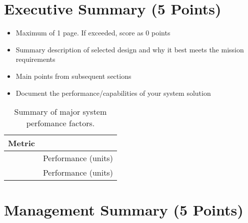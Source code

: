 \documentclass[report]{byu-aero}
\begin{document}


\setcounter{page}{2} %
\thispagestyle{tocpage} %
\tableofcontents %
{}

\clearpage
\newpage

\section{Executive Summary (5 Points)}
\label{sec:ExecutiveSummary}
\begin{itemize}
\item Maximum of 1 page. If exceeded, score as 0 points
\item Summary description of selected design and why it best meets the mission requirements
\item Main points from subsequent sections
\item Document the performance/capabilities of your system solution
\end{itemize}

\begin{table}[h!]
	\centering
	\caption{Summary of major system perfomance factors.}
	\label{tab:performancesummary}
	\begin{tabular}{ |c|c| } 
		\hline
		\rowcolor{BYUbluemid}
    	Metric & \\ 
		\hline
	     & Performance (units) \\ 
		\hline
		 & Performance (units) \\ 
		\hline
	\end{tabular}
\end{table}

\section{Management Summary (5 Points)}
\label{sec:ManagementSummary}
\end{document}
